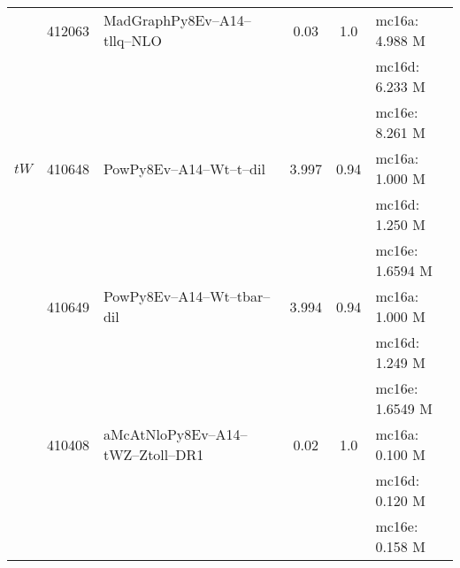 \begin{center}
{\begin{xtabular}{lclS[round-mode=figures, round-precision=3]S[round-mode=places,  round-precision=2]l}
			\midrule
			\tZq    & 412063 & MadGraphPy8Ev--A14--tllq--NLO                           &     0.03      & 1.0   & mc16a: 4.988 M   \\
			& & & & & mc16d: 6.233 M \\
			& & & & & mc16e: 8.261 M \\
			
			\midrule 
			$tW$    & 410648 & PowPy8Ev--A14--Wt--t--dil                    & 3.997        & 0.94  & mc16a: 1.000 M    \\ 
			& & & & & mc16d: 1.250 M \\
			& & & & & mc16e: 1.6594 M \\
			& 410649 & PowPy8Ev--A14--Wt--tbar--dil               & 3.994         & 0.94 & mc16a: 1.000 M    \\
			& & & & & mc16d: 1.249 M \\
			& & & & & mc16e: 1.6549 M \\
			
			\midrule
			\tWZ   & 410408 &  aMcAtNloPy8Ev--A14--tWZ--Ztoll--DR1    & 0.02    & 1.0   & mc16a: 0.100 M   \\
			& & & & & mc16d: 0.120 M \\
			& & & & & mc16e: 0.158 M \\
			

\end{xtabular}}
\end{center}
